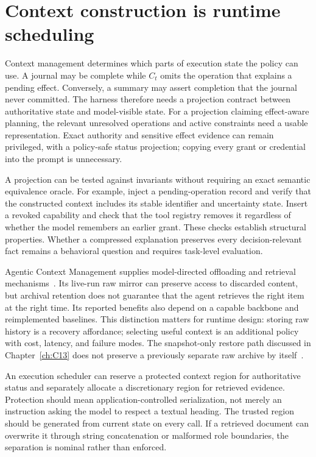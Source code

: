 \section{Context construction is runtime scheduling}\label{sec:C20:context}
Context management determines which parts of execution state the policy can use. A journal may be complete while $C_t$ omits the operation that explains a pending effect. Conversely, a summary may assert completion that the journal never committed. The harness therefore needs a projection contract between authoritative state and model-visible state. For a projection claiming effect-aware planning, the relevant unresolved operations and active constraints need a usable representation. Exact authority and sensitive effect evidence can remain privileged, with a policy-safe status projection; copying every grant or credential into the prompt is unnecessary.

A projection can be tested against invariants without requiring an exact semantic equivalence oracle. For example, inject a pending-operation record and verify that the constructed context includes its stable identifier and uncertainty state. Insert a revoked capability and check that the tool registry removes it regardless of whether the model remembers an earlier grant. These checks establish structural properties. Whether a compressed explanation preserves every decision-relevant fact remains a behavioral question and requires task-level evaluation.

Agentic Context Management supplies model-directed offloading and retrieval mechanisms~\cite{corpus260723809}. Its live-run raw mirror can preserve access to discarded content, but archival retention does not guarantee that the agent retrieves the right item at the right time. Its reported benefits also depend on a capable backbone and reimplemented baselines. This distinction matters for runtime design: storing raw history is a recovery affordance; selecting useful context is an additional policy with cost, latency, and failure modes. The snapshot-only restore path discussed in Chapter~\ref{ch:C13} does not preserve a previously separate raw archive by itself~\cite{repo_acm2026}.

An execution scheduler can reserve a protected context region for authoritative status and separately allocate a discretionary region for retrieved evidence. Protection should mean application-controlled serialization, not merely an instruction asking the model to respect a textual heading. The trusted region should be generated from current state on every call. If a retrieved document can overwrite it through string concatenation or malformed role boundaries, the separation is nominal rather than enforced.

